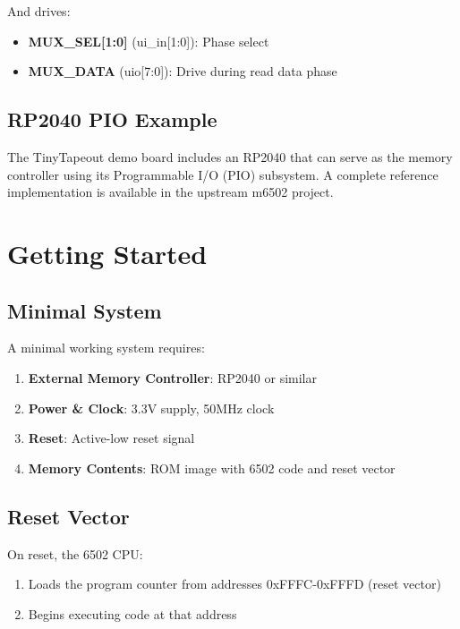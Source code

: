\documentclass[11pt,a4paper]{article}
\begin{document}
And drives:
\begin{itemize}
    \item \textbf{MUX\_SEL[1:0]} (ui\_in[1:0]): Phase select
    \item \textbf{MUX\_DATA} (uio[7:0]): Drive during read data phase
\end{itemize}

\subsection{RP2040 PIO Example}

The TinyTapeout demo board includes an RP2040 that can serve as the memory controller using its Programmable I/O (PIO) subsystem. A complete reference implementation is available in the upstream m6502 project.

\section{Getting Started}

\subsection{Minimal System}

A minimal working system requires:

\begin{enumerate}
    \item \textbf{External Memory Controller}: RP2040 or similar
    \item \textbf{Power \& Clock}: 3.3V supply, 50MHz clock
    \item \textbf{Reset}: Active-low reset signal
    \item \textbf{Memory Contents}: ROM image with 6502 code and reset vector
\end{enumerate}

\subsection{Reset Vector}

On reset, the 6502 CPU:
\begin{enumerate}
    \item Loads the program counter from addresses 0xFFFC-0xFFFD (reset vector)
    \item Begins executing code at that address
\end{enumerate}
\end{document}
